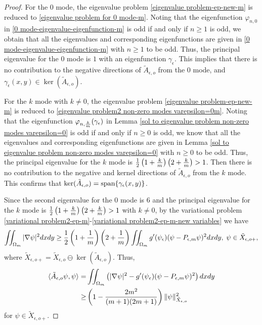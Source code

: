 \documentclass[1 [leqno, 11pt]{amsart}
\numberwithin{equation}{section}
\let\ep=\epsilon
\begin{document}
\begin{CJK*}{GBK}{song}
\begin{proof}
For the $0$ mode, the eigenvalue problem \eqref{eigenvalue problem-ep-new-m} is reduced to \eqref{eigenvalue problem for 0 mode-m}. Noting that the eigenfunction $\varphi_{n,0}$ in \eqref{0 mode-eigenvalue-eigenfunction-m} is odd if and only if $n\geq1$ is odd, we obtain that all the eigenvalues and corresponding eigenfunctions  are given in \eqref{0 mode-eigenvalue-eigenfunction-m} with $n\geq1$ to be odd. Thus, the principal eigenvalue  for the $0$ mode is $1$ with an eigenfunction $\gamma_\ep$. This implies that
 there is no contribution to the negative directions of $ \tilde A_{\ep,o} $ from the $0$ mode, and $\gamma_\ep(x,y)\in\ker( \tilde A_{\ep,o} )$.

For the $k$ mode with $k\neq0$, the eigenvalue problem \eqref{eigenvalue problem-ep-new-m} is reduced to \eqref{eigenvalue problem2 non-zero modes varepsilon=0m}. Noting that the eigenfunction $\varphi_{n,{k\over m}}(\gamma_\ep)$ in Lemma \ref{sol to eigenvalue problem non-zero modes varepsilon=0} is odd if and only if $n\geq0$ is odd, we know that
all the eigenvalues and corresponding  eigenfunctions  are given in Lemma  \ref{sol to eigenvalue problem non-zero modes varepsilon=0}  with $n\geq0$ to be odd. Thus, the principal eigenvalue  for the $k$ mode is ${1\over2}\left(1+{k\over m}\right)\left(2+{k\over m} \right)>1$. Then  there is no contribution to the negative and kernel directions of $ \tilde A_{\ep,o} $ from the $k$ mode.
This confirms that $\ker (\tilde A_{\ep,o})=\textup{span}\{\gamma_\ep(x,y)\}$.




Since the second  eigenvalue  for the $0$ mode is $6$ and the  principal eigenvalue  for the $k$ mode is ${1\over2}\left(1+{k\over m}\right)\left(2+{k\over m} \right)>1$ with $k\neq0$, by the variational problem \eqref{variational problem2-ep-m}-\eqref{variational problem2-ep-m-new variables} we have
\begin{align*}
\iint_{\Omega_m}|\nabla\psi|^2dxdy\geq{1\over2}\left(1+{1\over m}\right)\left(2+{1\over m}\right)\iint_{\Omega_m}g'(\psi_\ep)(\psi-P_{\ep,m}\psi)^2dxdy,\;\psi\in\tilde X_{\ep,o+},
\end{align*}
where $\tilde X_{\ep,o+}=\tilde X_{\ep,o} \ominus\ker (\tilde A_{\ep,o})$.
Thus,
\begin{align*}
 \langle\tilde A_{\ep,o}\psi,\psi\rangle=&\iint_{\Omega_m} \left(|\nabla\psi|^2-g'(\psi_\epsilon)(\psi - P_{\epsilon,m}\psi)^2\right) dxdy \\
 \geq& \left(1-{2m^2\over (m+1)(2m+1)}\right) \| \psi\|_{\tilde X_{\ep,o}}^2
\end{align*}
for $\psi\in\tilde X_{\ep,o+}$.


\end{proof}
\end{CJK*}
\end{document}

